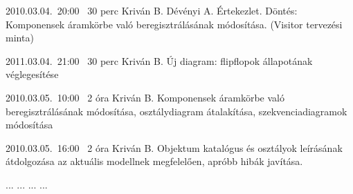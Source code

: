 \begin{naplo}
\bejegyzes
{2010.03.04.~20:00~}
{30 perc}
{Kriván B.\newline
Dévényi A.}
{Értekezlet.\newline
Döntés: Komponensek áramkörbe való beregisztrálásának módosítása. (Visitor tervezési minta)}

\bejegyzes
{2011.03.04.~21:00~} %
{30 perc} %
{Kriván B.} %
{Új diagram: flipflopok állapotának véglegesítése} %

\bejegyzes
{2010.03.05.~10:00~}
{2 óra}
{Kriván B.}
{Komponensek áramkörbe való beregisztrálásának módosítása, osztálydiagram átalakítása, szekvenciadiagramok módosítása}

\bejegyzes
{2010.03.05.~16:00~}
{2 óra}
{Kriván B.}
{Objektum katalógus és osztályok leírásának átdolgozása az aktuális modellnek megfelelően, apróbb hibák javítása.}

\bejegyzes
{...}
{...}
{...}
{...}

\end{naplo}
